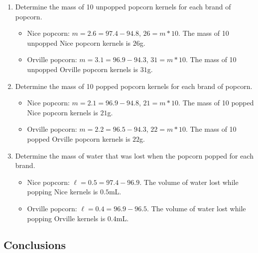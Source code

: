 \documentclass[12pt]{article}
\begin{document}
\begin{enumerate}
  \item Determine the mass of 10 unpopped popcorn kernels for each brand of
    popcorn.
    \begin{itemize}
      \item Nice popcorn: $m = 2.6 = 97.4 - 94.8$, $26 = m * 10$. The mass of
        10 unpopped Nice popcorn kernels is $26$g.
      \item Orville popcorn: $m = 3.1 = 96.9 - 94.3$, $31 = m * 10$. The mass
        of 10 unpopped Orville popcorn kernels is $31$g.
    \end{itemize}
  \item Determine the mass of 10 popped popcorn kernels for each brand of popcorn.
    \begin{itemize}
      \item Nice popcorn: $m = 2.1 = 96.9 - 94.8$, $21 = m * 10$. The mass of
        10 popped Nice popcorn kernels is $21$g.
      \item Orville popcorn: $m = 2.2 = 96.5 - 94.3$, $22 = m * 10$. The mass
        of 10 popped Orville popcorn kernels is $22$g.
    \end{itemize}
  \item Determine the mass of water that was lost when the popcorn popped for each brand.
    \begin{itemize}
      \item Nice popcorn: $\ell = 0.5 = 97.4 - 96.9$. The volume of water lost
        while popping Nice kernels is $0.5$mL.
      \item Orville popcorn: $\ell = 0.4 = 96.9 - 96.5$. The volume of water
        lost while popping Orville kernels is $0.4$mL.
    \end{itemize}
\end{enumerate}

\subsection{Conclusions}
\end{document}
